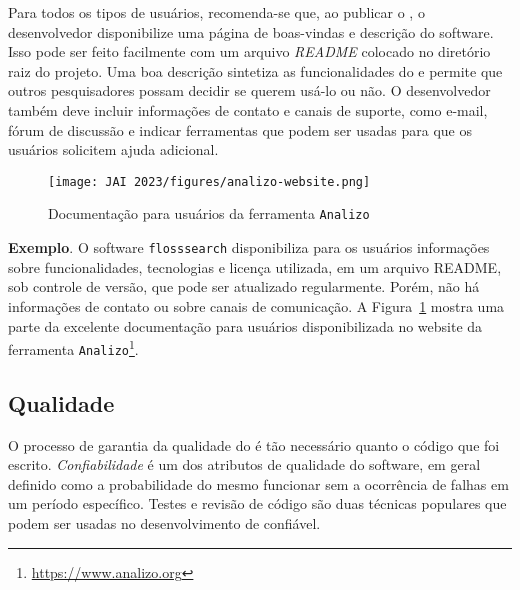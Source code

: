 Para todos os tipos de usuários,
recomenda-se que, ao publicar o \RS, o desenvolvedor  disponibilize uma página de boas-vindas e descrição do software. Isso pode ser feito facilmente com um arquivo \textit{README} colocado no diretório raiz do projeto.
Uma boa descrição sintetiza as funcionalidades do \RSw e permite que outros pesquisadores possam decidir se querem usá-lo ou não. O desenvolvedor também deve incluir informações de contato e canais de suporte, como e-mail, fórum de discussão e indicar ferramentas  que podem ser usadas para que os usuários solicitem ajuda adicional.

\begin{figure}[tb]
    \centering
    \texttt{[image: JAI 2023/figures/analizo-website.png]}
    \caption{Documentação para usuários da ferramenta \texttt{Analizo}}
    \label{fig:documentacao:analizo}
\end{figure}

\noindent \textbf{Exemplo}.
O software \texttt{flosssearch} disponibiliza para os usuários informações sobre funcionalidades, tecnologias e licença utilizada, em um arquivo README, sob controle de versão, que pode ser atualizado regularmente. Porém, não há informações de contato ou sobre canais de comunicação.
A Figura~\ref{fig:documentacao:analizo} mostra uma parte da excelente documentação para usuários disponibilizada no website da ferramenta \texttt{Analizo}\footnote{\url{https://www.analizo.org}}.


\subsection{Qualidade}

O processo de garantia da qualidade do \RSw é tão necessário quanto o código que foi escrito.
\textit{Confiabilidade} é um dos atributos de qualidade do software, em geral definido como a probabilidade do mesmo funcionar sem a ocorrência de falhas em um período específico.
Testes e revisão de código são duas técnicas populares que podem ser usadas no desenvolvimento de \RSw confiável.


